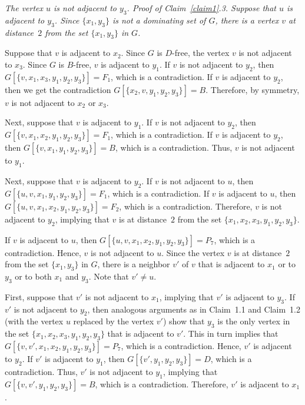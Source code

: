 \documentclass[12pt]{article}
\newenvironment{unnumbered}[1]{\trivlist \item [\hskip \labelsep {\bf
#1}]\ignorespaces\it}{\endtrivlist}
\begin{document}
\begin{unnumbered}{Claim~\ref{claim1}.3}
The vertex $u$ is not adjacent to $y_3$.
\end{unnumbered}
{\it Proof of Claim~\ref{claim1}.3.} Suppose that $u$ is adjacent to $y_3$. Since $\{x_1, y_3\}$ is not a dominating set of $G$, 
there is a vertex $v$ at distance~$2$ from the set $\{x_1,y_3\}$ in $G$.

Suppose that $v$ is adjacent to $x_2$.
Since $G$ is $D$-free, the vertex $v$ is not adjacent to $x_3$.
Since $G$ is $B$-free, $v$ is adjacent to $y_1$.
If $v$ is not adjacent to $y_2$, then $G[\{v,x_1,x_3,y_1, y_2, y_3\}]=F_1$, which is a contradiction.
If $v$ is adjacent to $y_2$, then we get the contradiction $G[\{x_2,v,y_1, y_2, y_3\}]=B$.
Therefore, by symmetry, $v$ is not adjacent to $x_2$ or $x_3$.

Next, suppose that $v$ is adjacent to $y_1$.
If $v$ is not adjacent to $y_2$, then $G[\{v,x_1,x_2,y_1, y_2, y_3\}]=F_1$, which is a contradiction.
If $v$ is adjacent to $y_2$, then $G[\{v,x_1,y_1, y_2, y_3\}]=B$, which is a contradiction.
Thus, $v$ is not adjacent to $y_1$.

Next, suppose that $v$ is adjacent to $y_2$.
If $v$ is not adjacent to $u$, then $G[\{u,v,x_1,y_1, y_2, y_3\}]=F_1$, which is a contradiction.
If $v$ is adjacent to $u$, then $G[\{u,v,x_1,x_2,y_1, y_2, y_3\}]=F_2$, which is a contradiction.
Therefore, $v$ is not adjacent to $y_2$, implying that $v$ is at distance~$2$ from the set $\{x_1,x_2,x_3,y_1,y_2,y_3\}$.

If $v$ is adjacent to $u$, then $G[\{u,v, x_1,x_2,y_1, y_2, y_3\}]=P_7$, which is a contradiction. Hence, $v$ is not adjacent to $u$.
Since the vertex $v$ is at distance~$2$ from the set $\{x_1,y_3\}$ in $G$, 
there is a neighbor $v'$ of $v$ that is adjacent to $x_1$ or to $y_3$ or to both $x_1$ and $y_3$. 
Note that $v' \ne u$.

First, suppose that $v'$ is not adjacent to $x_1$, implying that $v'$ is adjacent to $y_3$. If $v'$ is not adjacent to $y_2$, then analogous arguments as in Claim~1.1 and Claim~1.2 (with the vertex $u$ replaced by the vertex $v'$) show that $y_3$ is the only vertex in the set $\{x_1,x_2,x_3,y_1,y_2,y_3\}$ that is adjacent to $v'$. This in turn implies that $G[\{v,v', x_1,x_2,y_1, y_2, y_3\}]=P_7$, which is a contradiction. Hence, $v'$ is adjacent to $y_2$. If $v'$ is adjacent to $y_1$, then $G[\{v',y_1,y_2,y_3\}] = D$, which is a contradiction. Thus, $v'$ is not adjacent to $y_1$, implying that
$G[\{v,v', y_1, y_2, y_3\}]=B$, which is a contradiction. Therefore, $v'$ is adjacent to $x_1$.
\end{document}
